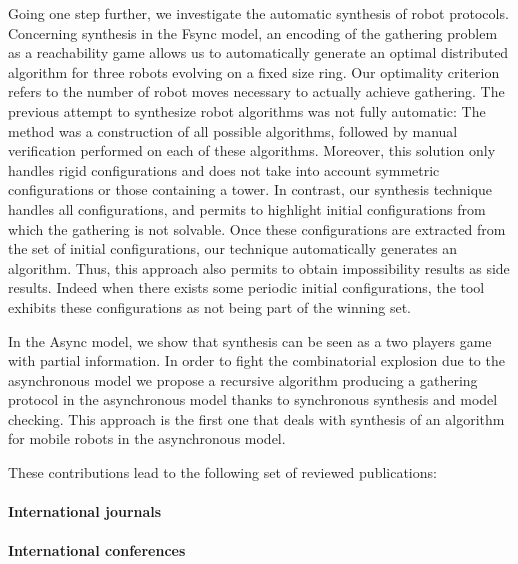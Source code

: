 Going one step further, we investigate the automatic synthesis of robot protocols.
Concerning synthesis in the Fsync model, 
an encoding of the gathering problem as a reachability game allows us to automatically generate an optimal distributed algorithm  for three robots evolving on a fixed size ring. Our optimality criterion refers to the number of robot moves necessary to actually achieve gathering.
The previous attempt to synthesize robot algorithms was not fully automatic: %
The method was a construction of all possible algorithms, followed by manual verification performed on each of these algorithms.
Moreover, this solution only handles rigid configurations and does not take into account symmetric configurations or those containing a tower. In contrast, our synthesis technique handles all configurations, and permits to highlight initial configurations from which the gathering is not solvable. Once these configurations are extracted from the set of initial configurations, our technique automatically generates an algorithm.
Thus, this approach also permits to obtain impossibility results as side results. Indeed when there exists some periodic initial configurations, 
the tool exhibits these configurations as not being part of the winning set.

In the Async model, we show that synthesis can be seen as a two players game with partial information. In order to fight the combinatorial explosion due to the asynchronous model we propose a recursive algorithm producing a gathering protocol in the asynchronous model thanks to synchronous synthesis and model checking.
This approach is the first one that deals with synthesis of an algorithm for mobile robots in the asynchronous model.


These contributions lead to the following set of reviewed publications:
\paragraph{International journals}
\begin{refsection}
   \nocite{*}
   \printbibliography[title=Bibliographie,keyword=own,keyword=intj,resetnumbers,heading=none,sorting=ynt]
\end{refsection}
\paragraph{International conferences}
\begin{refsection}
   \nocite{*}
   \printbibliography[title=Bibliographie,keyword=own,keyword=intc,resetnumbers,heading=none,sorting=ynt]
\end{refsection}
